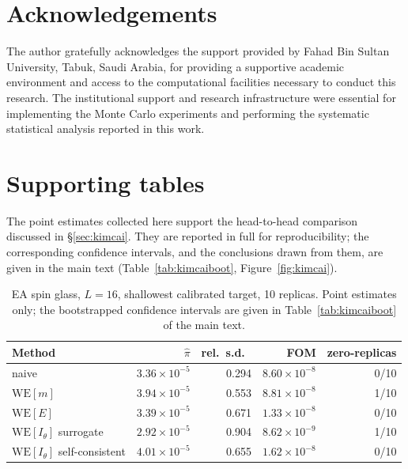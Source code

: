 \documentclass[a4paper,fleqn]{cas-sc}
\begin{document}
	\section*{Acknowledgements}
	The author gratefully acknowledges the support provided by Fahad Bin Sultan University, Tabuk, Saudi Arabia, for providing a supportive academic environment and access to the computational facilities necessary to conduct this research. The institutional support and research infrastructure were essential for implementing the Monte Carlo experiments and performing the systematic statistical analysis reported in this work.
	
	\printcredits
	
	\appendix
	\renewcommand{\thetable}{A.\arabic{table}}
	\setcounter{table}{0}
	\section{Supporting tables}\label{app:tables}
	The point estimates collected here support the head-to-head comparison discussed in
	\S\ref{sec:kimcai}. They are reported in full for reproducibility; the corresponding
	confidence intervals, and the conclusions drawn from them, are given in the main text
	(Table~\ref{tab:kimcaiboot}, Figure~\ref{fig:kimcai}).
	
	\begin{table}[H]
		\centering\small
		\caption{EA spin glass, $L=16$, shallowest calibrated target, 10 replicas. Point estimates
			only; the bootstrapped confidence intervals are given in
			Table~\ref{tab:kimcaiboot} of the main text.}
		\label{tab:kimcai}
		\begin{tabular}{lrrrr}
			\toprule
			Method & $\hat\pi$ & rel.\ s.d.\ & FOM & zero-replicas \\
			\midrule
			naive & $3.36\times10^{-5}$ & 0.294 & $8.60\times10^{-8}$ & 0/10 \\
			$\mathrm{WE}[m]$ & $3.94\times10^{-5}$ & 0.553 & $8.81\times10^{-8}$ & 1/10 \\
			$\mathrm{WE}[E]$ & $3.39\times10^{-5}$ & 0.671 & $1.33\times10^{-8}$ & 0/10 \\
			$\mathrm{WE}[I_\theta]$ surrogate & $2.92\times10^{-5}$ & 0.904 & $8.62\times10^{-9}$ & 1/10 \\
			$\mathrm{WE}[I_\theta]$ self-consistent & $4.01\times10^{-5}$ & 0.655 &
			$1.62\times10^{-8}$ & 0/10 \\
			\bottomrule
		\end{tabular}
	\end{table}
	
	
	
	
\end{document}
